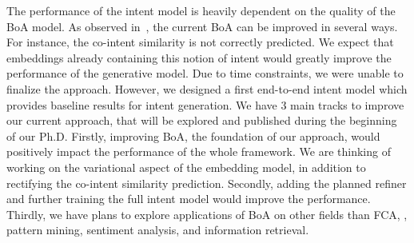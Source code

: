 The performance of the intent model is heavily dependent on the quality of the BoA model.
As observed in~\cite{boa:2020:marquer}, the current BoA can be improved in several ways.
For instance, the co-intent similarity is not correctly predicted.
We expect that embeddings already containing this notion of intent would greatly improve the performance of the generative model.
Due to time constraints, we were unable to finalize the approach.
However, we designed a first end-to-end intent model which provides baseline results for intent generation.
%
We have 3 main tracks to improve our current approach, that will be explored and published during the beginning of our Ph.D.
Firstly, improving BoA, the foundation of our approach, would positively impact the performance of the whole framework.
We are thinking of working on the variational aspect of the embedding model, in addition to rectifying the co-intent similarity prediction.
Secondly, adding the planned refiner and further training the full intent model would improve the performance.
Thirdly, we have plans to explore applications of BoA on other fields than FCA, \eg, pattern mining, sentiment analysis, and information retrieval.


